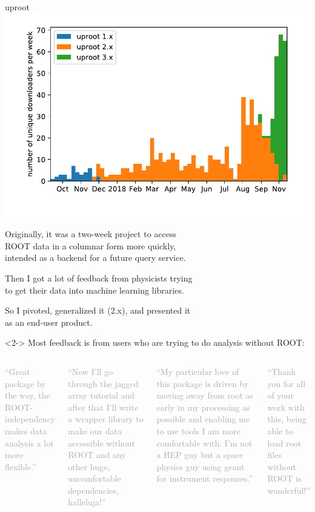 \documentclass[aspectratio=169]{beamer}
\begin{document}
\begin{frame}{uproot}
\hfill \mbox{\includegraphics[height=4.5 cm]{weeks_byversion.pdf}\hspace{-1 cm}}

\vspace{-4.25 cm}
Originally, it was a two-week project to access \\ ROOT data in a columnar form more quickly, \\ intended as a backend for a future query service.

\vspace{0.35 cm}
Then I got a lot of feedback from physicists trying \\ to get their data into machine learning libraries.

\vspace{0.35 cm}
So I pivoted, generalized it (2.x), and presented it \\ as an end-user product.

\vspace{0.35 cm}
\begin{uncoverenv}<2->
Most feedback is from users who are trying to do analysis without ROOT:

\vspace{0.05 cm}
\scriptsize
\begin{columns}
\textcolor{darkgray}{``Great package by the way, the ROOT-independency makes data analysis a lot more flexible.''}

\vspace{0.25 cm}
\textcolor{darkgray}{``Now I'll go through the jagged array tutorial and after that I'll write a wrapper library to make our data accessible without ROOT and any other huge, uncomfortable dependencies, halleluja!''}


\textcolor{darkgray}{``My particular love of this package is driven by moving away from root as early in my processing as possible and enabling me to use tools I am more comfortable with. I'm not a HEP guy but a space physics guy using geant for instrument responses.''}

\vspace{0.25 cm}
\textcolor{darkgray}{``Thank you for all of your work with this, being able to load root files without ROOT is wonderful!''}
\end{columns}
\end{uncoverenv}
\end{frame}
\end{document}
